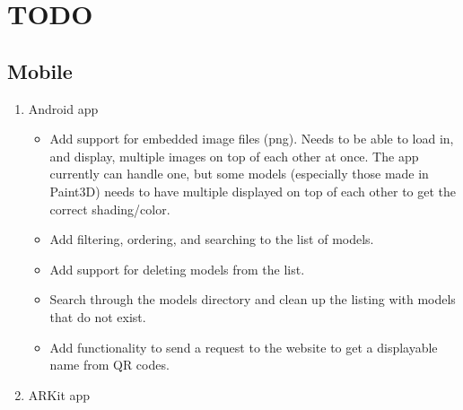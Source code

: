 
\chapter{TODO}

    \section{Mobile}
        \begin{enumerate}
            \item Android app
            \begin{itemize}
                \item Add support for embedded image files (png).  Needs to be able to load in, and display, multiple images on top of each other at once.  The app currently can handle one, but some models (especially those made in Paint3D) needs to have multiple displayed on top of each other to get the correct shading/color.

                \item Add filtering, ordering, and searching to the list of models.

                \item Add support for deleting models from the list.

                \item Search through the models directory and clean up the listing with models that do not exist.

                \item Add functionality to send a request to the website to get a displayable name from QR codes.
            \end{itemize}
            \item ARKit app
        \end{enumerate}